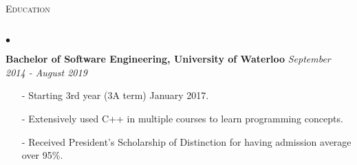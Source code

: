 \documentclass[11pt]{article}
\newcommand{\lineunder}{\vspace*{-8pt} \\ \hspace*{-18pt} \hrulefill \\}
\newcommand{\header}[1]{{\hspace*{-15pt}\vspace*{6pt} \textsc{#1}} \vspace*{-6pt} \lineunder }
\newenvironment{achievements}{\begin{list}{$\bullet$}{\topsep 0pt \itemsep -1.5pt \leftmargin 5pt}}{\vspace*{4pt}\end{list}}
\begin{document}
\vspace{6pt}

\header{\fontsize{11.1}{10}\selectfont  Education}
\begin{achievements}
\item \textbf{Bachelor of Software Engineering, University of Waterloo} \hfill \textit {September 2014 - August 2019}
\begin{itemize}
\vspace{2pt}
\item[-] Starting 3rd year (3A term) January 2017. \vspace{2pt}
\item[-] Extensively used C++ in multiple courses to learn programming concepts.
\vspace{2pt}
\item[-] Received President's Scholarship of Distinction for having admission average over 95\%.
\vspace{2pt}
\end{itemize}
\end{achievements}
\end{document}
